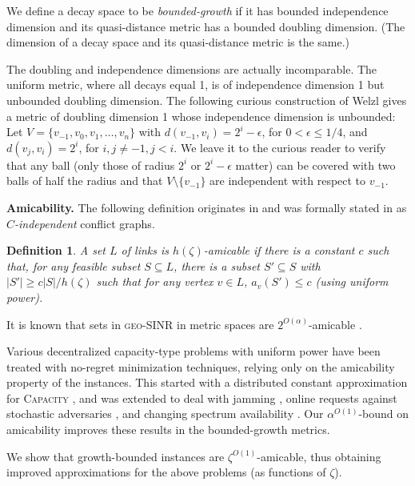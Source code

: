 \documentclass[11pt]{amsart}
\newtheorem{definition}{Definition}[section]
\newcommand{\prob}[1]{\textsc{#1}}
\newcommand{\Capacity}{\prob{Capacity}}
\newcommand{\capacity}{\Capacity}
\newcommand{\geomodel}{\textsc{geo-SINR}}
\newcommand{\define}[1]{\emph{#1}} \newcommand{\degree}{^\circ}
\newcommand{\mypara}[1]{\smallskip\noindent\textbf{#1.}}  \newcommand{\tightpara}[1]{\noindent\textbf{#1.}}  \newcommand{\inddim}{D}
\begin{document}
We define a decay space to be \emph{bounded-growth} if it has bounded
independence dimension and its quasi-distance metric has a bounded
doubling dimension.  (The dimension of a decay space and its
quasi-distance metric is the same.)

The doubling and independence dimensions are actually incomparable.
The uniform metric, where all decays equal 1, is of independence
dimension 1 but unbounded doubling dimension.
The following curious construction of Welzl \cite{Welzl08} gives a
metric of doubling dimension 1 whose independence dimension is unbounded:
Let $V=\{v_{-1}, v_0, v_1, \ldots, v_n\}$ with
$d(v_{-1},v_i)=2^i-\epsilon$, for $0 < \epsilon \le 1/4$, and $d(v_j, v_i)
= 2^i$, for $i, j \ne -1, j < i$. We leave it to the curious reader to
verify that any ball (only those of radius $2^i$ or $2^{i}-\epsilon$
matter) can be covered with two balls of half the radius and that $V
\setminus \{v_{-1}\}$ are independent with respect to $v_{-1}$.

\mypara{Amicability}
The following definition originates in \cite{infocom11} and 
was formally stated in \cite{dams2013sleeping} as \emph{$C$-independent} conflict graphs.

\begin{definition}
A set $L$ of links is \define{$h(\zeta)$-amicable} if there is a constant $c$ such that, for
any feasible subset $S \subseteq L$, there is a subset $S' \subseteq S$ with $|S'| \ge c |S|/h(\zeta)$ such that for any vertex $v \in L$, $a_v(S') \le c$ (using uniform power).
\end{definition}

It is known that sets in {\geomodel} in metric spaces are $2^{O(\alpha)}$-amicable \cite{infocom11}.


Various decentralized capacity-type problems with uniform power have been treated with no-regret minimization techniques, relying only on the amicability property of the instances. This started with a distributed constant approximation for {\capacity} \cite{Dinitz2010,infocom11}, and was extended to deal with jamming \cite{dams2013jamming}, online requests against stochastic adversaries \cite{GHKSV13}, and changing spectrum availability \cite{dams2013sleeping}.
Our $\alpha^{O(1)}$-bound on amicability improves these results in 
the bounded-growth metrics.

We show that growth-bounded instances are $\zeta^{O(1)}$-amicable,
thus obtaining improved approximations for the above problems (as
functions of $\zeta$).
\end{document}
